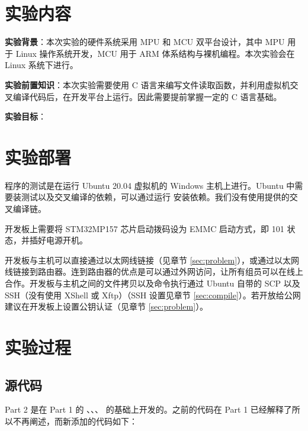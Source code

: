 
\section{实验内容}

\textbf{实验背景}：本次实验的硬件系统采用 MPU 和 MCU 双平台设计，其中 MPU 用于 Linux 操作系统开发，MCU 用于 ARM 体系结构与裸机编程。本次实验会在 Linux 系统下进行。

\textbf{实验前置知识}：本次实验需要使用 C 语言来编写文件读取函数，并利用虚拟机交叉编译代码后，在开发平台上运行。因此需要提前掌握一定的 C 语言基础。

\textbf{实验目标}：



\section{实验部署}

程序的测试是在运行 Ubuntu 20.04 虚拟机的 Windows 主机上进行。Ubuntu 中需要装测试以及交叉编译的依赖，可以通过运行  安装依赖。我们没有使用提供的交叉编译链。

开发板上需要将 STM32MP157 芯片启动拨码设为 EMMC 启动方式，即 101 状态，并插好电源开机。

开发板与主机可以直接通过以太网线链接（见章节 \ref{sec:problem}），或通过以太网线链接到路由器。连到路由器的优点是可以通过外网访问，让所有组员可以在线上合作。开发板与主机之间的文件拷贝以及命令执行通过 Ubuntu 自带的 SCP 以及 SSH（没有使用 XShell 或 Xftp）（SSH 设置见章节 \ref{sec:compile}）。若开放给公网建议在开发板上设置公钥认证（见章节 \ref{sec:problem}）。

\section{实验过程}

\subsection{源代码}


Part 2 是在 Part 1 的 、、、 的基础上开发的。之前的代码在 Part 1 已经解释了所以不再阐述，而新添加的代码如下：

